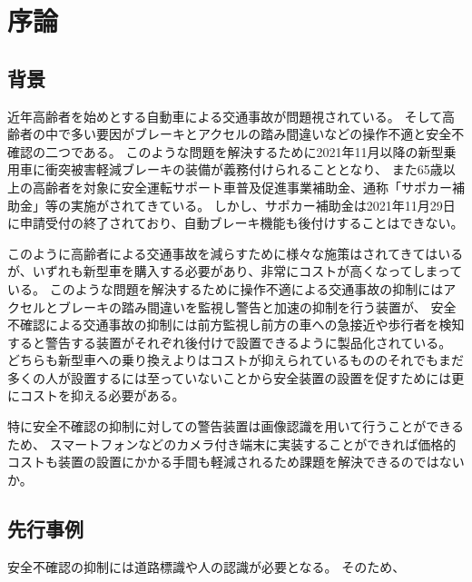 \chapter{序論}
\section{背景}
近年高齢者を始めとする自動車による交通事故が問題視されている。
そして高齢者の中で多い要因がブレーキとアクセルの踏み間違いなどの操作不適と安全不確認の二つである。
このような問題を解決するために2021年11月以降の新型乗用車に衝突被害軽減ブレーキの装備が義務付けられることとなり、
また65歳以上の高齢者を対象に安全運転サポート車普及促進事業補助金、通称「サポカー補助金」等の実施がされてきている。
しかし、サポカー補助金は2021年11月29日に申請受付の終了されており、自動ブレーキ機能も後付けすることはできない。

このように高齢者による交通事故を減らすために様々な施策はされてきてはいるが、いずれも新型車を購入する必要があり、非常にコストが高くなってしまっている。
このような問題を解決するために操作不適による交通事故の抑制にはアクセルとブレーキの踏み間違いを監視し警告と加速の抑制を行う装置が、
安全不確認による交通事故の抑制には前方監視し前方の車への急接近や歩行者を検知すると警告する装置がそれぞれ後付けで設置できるように製品化されている。
どちらも新型車への乗り換えよりはコストが抑えられているもののそれでもまだ多くの人が設置するには至っていないことから安全装置の設置を促すためには更にコストを抑える必要がある。

特に安全不確認の抑制に対しての警告装置は画像認識を用いて行うことができるため、
スマートフォンなどのカメラ付き端末に実装することができれば価格的コストも装置の設置にかかる手間も軽減されるため課題を解決できるのではないか。

\section{先行事例}

安全不確認の抑制には道路標識や人の認識が必要となる。
そのため、










%
